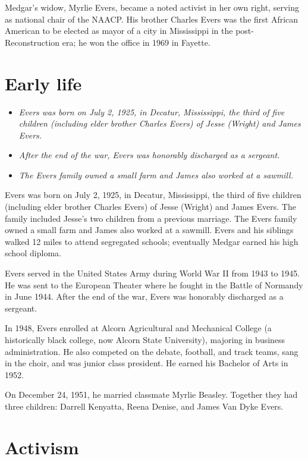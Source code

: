 Medgar's widow, Myrlie Evers, became a noted activist in her own right,
serving as national chair of the NAACP. His brother Charles Evers was
the first African American to be elected as mayor of a city in
Mississippi in the post-Reconstruction era; he won the office in 1969 in
Fayette.

\section{Early life}\label{early-life}

\begin{itemize}
\item
  \emph{Evers was born on July 2, 1925, in Decatur, Mississippi, the
  third of five children (including elder brother Charles Evers) of
  Jesse (Wright) and James Evers.}
\item
  \emph{After the end of the war, Evers was honorably discharged as a
  sergeant.}
\item
  \emph{The Evers family owned a small farm and James also worked at a
  sawmill.}
\end{itemize}

Evers was born on July 2, 1925, in Decatur, Mississippi, the third of
five children (including elder brother Charles Evers) of Jesse (Wright)
and James Evers. The family included Jesse's two children from a
previous marriage. The Evers family owned a small farm and James also
worked at a sawmill. Evers and his siblings walked 12 miles to attend
segregated schools; eventually Medgar earned his high school diploma.

Evers served in the United States Army during World War II from 1943 to
1945. He was sent to the European Theater where he fought in the Battle
of Normandy in June 1944. After the end of the war, Evers was honorably
discharged as a sergeant.

In 1948, Evers enrolled at Alcorn Agricultural and Mechanical College (a
historically black college, now Alcorn State University), majoring in
business administration. He also competed on the debate, football, and
track teams, sang in the choir, and was junior class president. He
earned his Bachelor of Arts in 1952.

On December 24, 1951, he married classmate Myrlie Beasley. Together they
had three children: Darrell Kenyatta, Reena Denise, and James Van Dyke
Evers.

\section{Activism}\label{activism}

